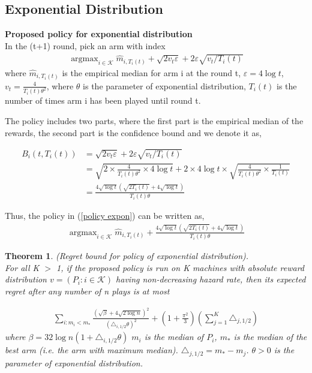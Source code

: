 \documentclass{article}
\DeclareMathOperator*{\argmax}{argmax}
\theoremstyle{plain}
\newtheorem{theo}{Theorem}
\begin{document}
\subsection{Exponential Distribution}

\textbf{Proposed policy for exponential distribution}\\

In the (t+1) round, pick an arm with index 
\begin{align}
   \label{policy expon}
   \argmax_{i \in \mathcal{K}} \hat{m}_{i, T_i(t)} + \sqrt{2v_t \varepsilon} + 2 \varepsilon \sqrt{v_t/T_i(t)}
\end{align}
where $\hat{m}_{i, T_i(t)}$ is the empirical median for arm i at the round t, $\varepsilon = 4 \log t$, $v_t = \frac{4 }{T_i(t) \theta^2}$, where $\theta$ is the parameter of exponential distribution, $T_i(t)$ is the number of times arm i has been played until round t.  

The policy includes two parts, where the first part is the empirical median of the rewards, the second part is the confidence bound and we denote it as,

\begin{align}
B_i(t, T_i(t)) &= \sqrt{2v_t \varepsilon} + 2 \varepsilon \sqrt{v_t/T_i(t)}\\
&= \sqrt{2 \times \frac{4 }{T_i(t) \theta^2} \times 4 \log t} + 2 \times 4 \log t \times \sqrt{\frac{4 }{T_i(t) \theta^2} \times \frac{1}{T_i(t)}}\\
&= \frac{4 \sqrt{\log t} ( \sqrt{ 2T_i(t)} + 4\sqrt{\log t})}{T_i(t) \theta}
\end{align}

Thus, the policy in (\ref{policy expon}) can be written as,
\begin{align}
    \argmax_{i \in \mathcal{K}} \hat{m}_{i, T_i(t)} +  \frac{4 \sqrt{\log t} ( \sqrt{ 2T_i(t)} + 4\sqrt{\log t})}{T_i(t) \theta}
\end{align}

\begin{theo}
(Regret bound for policy of exponential distribution). \\

For all K $>$ 1, if the proposed policy is run on K machines with absolute reward distribution $v = (P_i: i \in \mathcal{K})$ having non-decreasing hazard rate, then its expected regret after any number of n plays is at most 

\begin{align}
    \sum_{i: m_i < m_\ast} \frac{(\sqrt{\beta} + 4\sqrt{2\log n})^2}{ (\triangle_{i, 1/2} \theta)^2} + (1 + \frac{\pi^2}{3}) (\sum_{j=1}^K \triangle_{j, 1/2}) 
\end{align}
where $\beta = 32 \log n (1 + \triangle_{i, 1/2} \theta)$ $m_i$ is the median of $P_i$, $m_\ast$ is the median of the best arm (i.e. the arm with maximum median). $\triangle_{j, 1/2} = m_\ast - m_j$. $\theta > 0$ is the parameter of exponential distribution. 
\end{theo}
\end{document}
